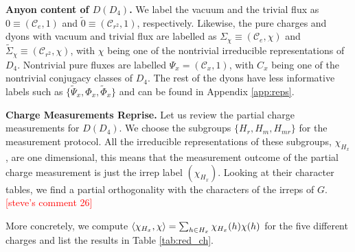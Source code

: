 \documentclass[two column]{article}
\newcommand{\caro}[1]{\textcolor{red}{[#1]}}
\newcommand{\jovan}[1]{\textcolor{blue}{[#1]}}
\begin{document}
\textbf{Anyon content of $D(D_4)$.} We label the vacuum and the trivial flux as $0 \equiv (\mathcal{C}_e, 1)$ and $\tilde 0 \equiv (\mathcal{C}_{r^2}, 1)$, respectively. Likewise, the pure charges and dyons with vacuum and trivial flux are labelled as $\Sigma_{\chi} \equiv (\mathcal{C}_e, \chi)$ and $\tilde{\Sigma}_{\chi} \equiv (\mathcal{C}_{r^2}, \chi)$, with $\chi$ being one of the nontrivial irreducible representations of $D_4$.
Nontrivial pure fluxes are labelled $\Psi_x = (\mathcal{C}_x, 1)$, with $C_x$ being one of the nontrivial conjugacy classes of $D_4$. The rest of the dyons have less informative labels such as $\{\tilde{\Psi}_x, \Phi_x, \tilde{\Phi}_x\}$ and can be found in Appendix \ref{app:reps}.

\textbf{Charge Measurements Reprise.}
Let us review the partial charge measurements for $D(D_4)$.
We choose the subgroups $\{H_r, H_m, H_{mr}\}$ for the measurement protocol. All the irreducible representations of these subgroups, $\chi_{H_x}$, are one dimensional, this means that the measurement outcome of the partial charge measurement is just the irrep label $(\chi_{H_x})$. Looking at their character tables, we find a partial orthogonality with the characters of the irreps of $G$. 
\caro{steve's comment 26}



More concretely, we compute $ \braket{\chi_{H_x}, \chi} = \sum_{h\in H_x} \chi_{H_x}(h)\chi(h)$ for the five different charges and list the results in Table \ref{tab:red_ch}.
\end{document}
